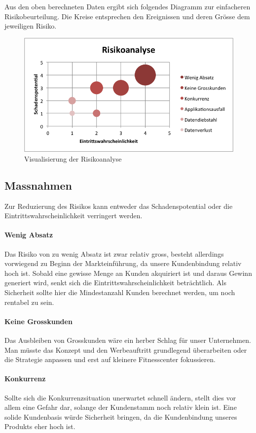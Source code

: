 \noindent Aus den oben berechneten Daten ergibt sich folgendes Diagramm zur einfacheren Risikobeurteilung. Die Kreise entsprechen den Ereignissen und deren Grösse dem jeweiligen Risiko.
\begin{figure}[H]
	\centering
	\includegraphics[width=0.8\linewidth]{images/risikoanalyse}
	\caption{Visualisierung der Risikoanalyse}
	\label{fig:visualisierung-risikoanalyse}
\end{figure}

\clearpage

\subsection{Massnahmen}
Zur Reduzierung des Risikos kann entweder das Schadenspotential oder die Eintrittswahrscheinlichkeit verringert werden.
\paragraph{Wenig Absatz}
Das Risiko von zu wenig Absatz ist zwar relativ gross, besteht allerdings vorwiegend zu Beginn der Markteinführung, da unsere Kundenbindung relativ hoch ist. Sobald eine gewisse Menge an Kunden akquiriert ist und daraus Gewinn generiert wird, senkt sich die Eintrittswahrscheinlichkeit beträchtlich. Als Sicherheit sollte hier die Mindestanzahl Kunden berechnet werden, um noch rentabel zu sein. 
\paragraph{Keine Grosskunden}
Das Ausbleiben von Grosskunden wäre ein herber Schlag für unser Unternehmen. Man müsste das Konzept und den Werbeauftritt grundlegend überarbeiten oder die Strategie anpassen und erst auf kleinere Fitnesscenter fokussieren.
\paragraph{Konkurrenz}
Sollte sich die Konkurrenzsituation unerwartet schnell ändern, stellt dies vor allem eine Gefahr dar, solange der Kundenstamm noch relativ klein ist. Eine solide Kundenbasis würde Sicherheit bringen, da die Kundenbindung unseres Produkts eher hoch ist.
